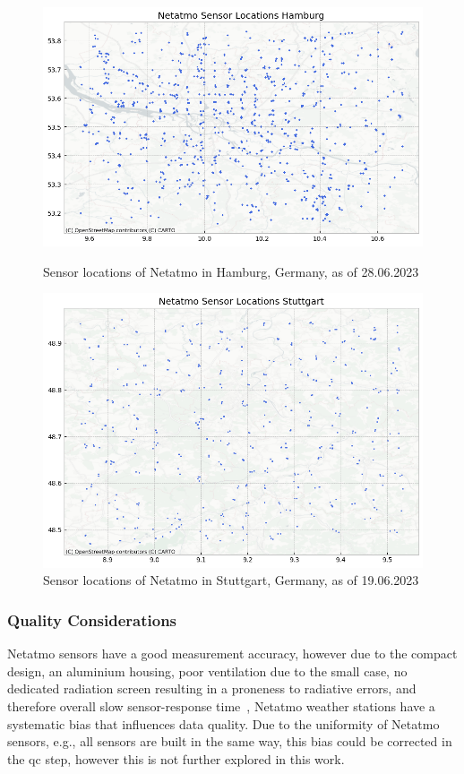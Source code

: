 \begin{figure}[htp]
    \centering
    \includegraphics[width=1\textwidth]{images/netatmo_sensor_locations_hamburg.png}
    \caption{Sensor locations of Netatmo in Hamburg, Germany, as of 28.06.2023}
    \label{fig:netatmo sensor locations hamburg}

    \includegraphics[width=1\textwidth]{images/netatmo_sensor_locations_stuttgart.png}
    \caption{Sensor locations of Netatmo in Stuttgart, Germany, as of 19.06.2023}
    \label{fig:netatmo sensor locations stuttgart}
\end{figure}

\subsubsection{Quality Considerations}

Netatmo sensors have a good measurement accuracy, however due to the compact design, an aluminium housing, poor ventilation due to the small case, no dedicated radiation screen resulting in a proneness to radiative errors, and therefore overall slow sensor-response time~\cite{meier2017crowdsourcing, buchau2018modelling}, Netatmo weather stations have a systematic bias that influences data quality. Due to the uniformity of Netatmo sensors, e.g., all sensors are built in the same way, this bias could be corrected in the \gls{qc} step, however this is not further explored in this work.

